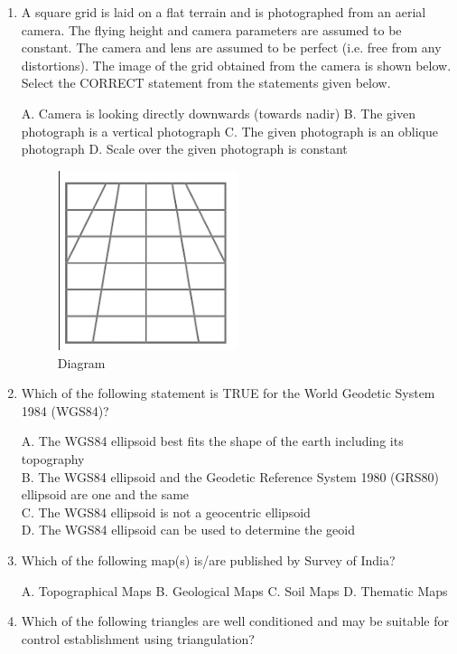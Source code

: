 \documentclass[journal,12pt,onecolumn]{IEEEtran}
\begin{document}
\begin{enumerate}
    \item A square grid is laid on a flat terrain and is photographed from an aerial camera. The flying height and camera parameters are assumed to be constant. The camera and lens are assumed to be perfect (i.e. free from any distortions). The image of the grid obtained from the camera is shown below. Select the CORRECT statement from the statements given below.

    A. Camera is looking directly downwards (towards nadir) \quad
    B. The given photograph is a vertical photograph \quad
    C. The given photograph is an oblique photograph \quad
    D. Scale over the given photograph is constant

\begin{figure}[h] 
    \centering
    \includegraphics[width=0.5\textwidth]{figs/qn50.png}
    \caption{Diagram}
\label{fig:qn50}
\end{figure}
    \item Which of the following statement is TRUE for the World Geodetic System 1984 (WGS84)?

    A. The WGS84 ellipsoid best fits the shape of the earth including its topography \\
    B. The WGS84 ellipsoid and the Geodetic Reference System 1980 (GRS80) ellipsoid are one and the same \\
    C. The WGS84 ellipsoid is not a geocentric ellipsoid \\
    D. The WGS84 ellipsoid can be used to determine the geoid

    \item Which of the following map(s) is/are published by Survey of India?

    A. Topographical Maps \quad
    B. Geological Maps \quad
    C. Soil Maps \quad
    D. Thematic Maps

    \item Which of the following triangles are well conditioned and may be suitable for control establishment using triangulation?


\end{enumerate}
\end{document}
